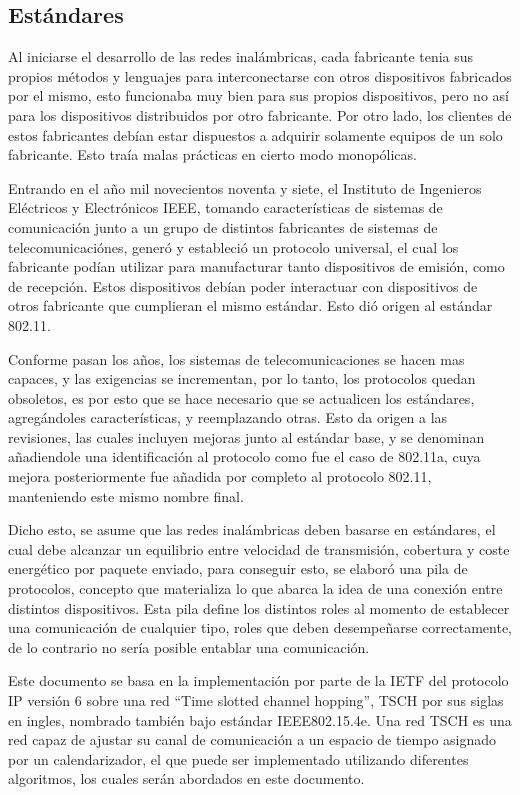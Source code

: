 \subsection{Estándares}

Al iniciarse el desarrollo de las redes inalámbricas, cada fabricante tenia sus propios métodos y lenguajes para interconectarse con otros dispositivos fabricados por el mismo, esto funcionaba muy bien para sus propios dispositivos, pero no así para los dispositivos distribuidos por otro fabricante. Por otro lado, los clientes de estos fabricantes debían estar dispuestos a adquirir solamente equipos de un solo fabricante. Esto traía malas prácticas en cierto modo monopólicas.

Entrando en el año mil novecientos noventa y siete, el Instituto de Ingenieros Eléctricos y Electrónicos IEEE, tomando características de sistemas de comunicación junto a un grupo de distintos fabricantes de sistemas de telecomunicaciónes, generó y estableció un protocolo universal, el cual los fabricante podían utilizar para manufacturar tanto dispositivos de emisión, como de recepción. Estos dispositivos debían poder interactuar con dispositivos de otros fabricante que cumplieran el mismo estándar. Esto dió origen al estándar 802.11. \cite{crow1997ieee}

Conforme pasan los años, los sistemas de telecomunicaciones se hacen mas capaces, y las exigencias se incrementan, por lo tanto, los protocolos quedan obsoletos, es por esto que se hace necesario que se actualicen los estándares, agregándoles características, y reemplazando otras. Esto da origen a las revisiones, las cuales incluyen mejoras junto al estándar base, y se denominan añadiendole una identificación al protocolo como fue el caso de 802.11a, cuya mejora posteriormente fue añadida por completo al protocolo 802.11, manteniendo este mismo nombre final.

Dicho esto, se asume que las redes inalámbricas deben basarse en estándares, el cual debe alcanzar un equilibrio entre velocidad de transmisión, cobertura y coste energético por paquete enviado, para conseguir esto, se elaboró una pila de protocolos, concepto que materializa lo que abarca la idea de una conexión entre distintos dispositivos. Esta pila define los distintos roles al momento de establecer una comunicación de cualquier tipo, roles que deben desempeñarse correctamente, de lo contrario no sería posible entablar una comunicación.

Este documento se basa en la implementación por parte de la IETF del protocolo IP versión 6 sobre una red ``Time slotted channel hopping'', TSCH por sus siglas en ingles, nombrado también bajo estándar IEEE802.15.4e. Una red TSCH es una red capaz de ajustar su canal de comunicación a un espacio de tiempo asignado por un calendarizador, el que puede ser implementado utilizando diferentes algoritmos, los cuales serán abordados en este documento.

